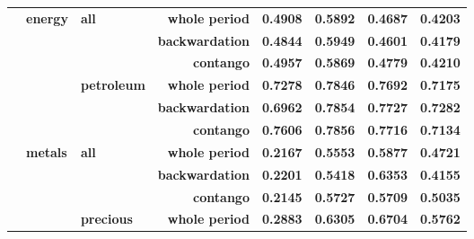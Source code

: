\documentclass[
  authoryear,
  preprint,
  3p]{elsarticle}
\begin{document}
\begin{longtable}[t]{>{}l>{}l>{}l>{}r>{}r>{}r>{}r>{}r}
\textbf{} & \textbf{energy} & \textbf{all} & \textbf{whole period} & \textcolor[HTML]{4285f4}{\textbf{0.4908}} & \textcolor[HTML]{4285f4}{\textbf{0.5892}} & \textcolor[HTML]{4285f4}{\textbf{0.4687}} & \textcolor[HTML]{4285f4}{\textbf{0.4203}}\\
\textbf{} & \textbf{} & \textbf{} & \textbf{backwardation} & \textcolor[HTML]{4285f4}{\textbf{0.4844}} & \textcolor[HTML]{4285f4}{\textbf{0.5949}} & \textcolor[HTML]{4285f4}{\textbf{0.4601}} & \textcolor[HTML]{4285f4}{\textbf{0.4179}}\\
\addlinespace
\textbf{} & \textbf{} & \textbf{} & \textbf{contango} & \textcolor[HTML]{4285f4}{\textbf{0.4957}} & \textcolor[HTML]{4285f4}{\textbf{0.5869}} & \textcolor[HTML]{4285f4}{\textbf{0.4779}} & \textcolor[HTML]{4285f4}{\textbf{0.4210}}\\
\textbf{} & \textbf{} & \textbf{petroleum} & \textbf{whole period} & \textcolor[HTML]{4285f4}{\textbf{0.7278}} & \textcolor[HTML]{4285f4}{\textbf{0.7846}} & \textcolor[HTML]{4285f4}{\textbf{0.7692}} & \textcolor[HTML]{4285f4}{\textbf{0.7175}}\\
\textbf{} & \textbf{} & \textbf{} & \textbf{backwardation} & \textcolor[HTML]{4285f4}{\textbf{0.6962}} & \textcolor[HTML]{4285f4}{\textbf{0.7854}} & \textcolor[HTML]{4285f4}{\textbf{0.7727}} & \textcolor[HTML]{4285f4}{\textbf{0.7282}}\\
\textbf{} & \textbf{} & \textbf{} & \textbf{contango} & \textcolor[HTML]{4285f4}{\textbf{0.7606}} & \textcolor[HTML]{4285f4}{\textbf{0.7856}} & \textcolor[HTML]{4285f4}{\textbf{0.7716}} & \textcolor[HTML]{4285f4}{\textbf{0.7134}}\\
\textbf{} & \textbf{metals} & \textbf{all} & \textbf{whole period} & \textcolor[HTML]{4285f4}{\textbf{0.2167}} & \textcolor[HTML]{4285f4}{\textbf{0.5553}} & \textcolor[HTML]{4285f4}{\textbf{0.5877}} & \textcolor[HTML]{4285f4}{\textbf{0.4721}}\\
\addlinespace
\textbf{} & \textbf{} & \textbf{} & \textbf{backwardation} & \textcolor[HTML]{4285f4}{\textbf{0.2201}} & \textcolor[HTML]{4285f4}{\textbf{0.5418}} & \textcolor[HTML]{4285f4}{\textbf{0.6353}} & \textcolor[HTML]{4285f4}{\textbf{0.4155}}\\
\textbf{} & \textbf{} & \textbf{} & \textbf{contango} & \textcolor[HTML]{4285f4}{\textbf{0.2145}} & \textcolor[HTML]{4285f4}{\textbf{0.5727}} & \textcolor[HTML]{4285f4}{\textbf{0.5709}} & \textcolor[HTML]{4285f4}{\textbf{0.5035}}\\
\textbf{} & \textbf{} & \textbf{precious} & \textbf{whole period} & \textcolor[HTML]{4285f4}{\textbf{0.2883}} & \textcolor[HTML]{4285f4}{\textbf{0.6305}} & \textcolor[HTML]{4285f4}{\textbf{0.6704}} & \textcolor[HTML]{4285f4}{\textbf{0.5762}}\\

\end{longtable}
\end{document}

